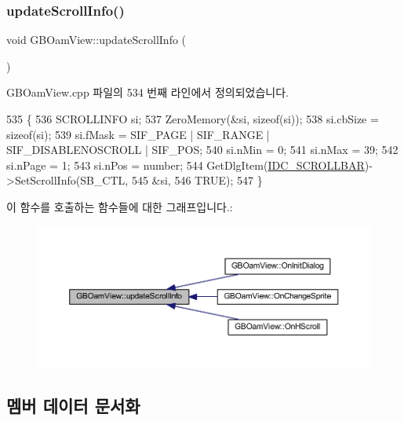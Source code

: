 \subsubsection{\texorpdfstring{update\+Scroll\+Info()}{updateScrollInfo()}}
{\footnotesize\ttfamily void G\+B\+Oam\+View\+::update\+Scroll\+Info (\begin{DoxyParamCaption}{ }\end{DoxyParamCaption})}



G\+B\+Oam\+View.\+cpp 파일의 534 번째 라인에서 정의되었습니다.


\begin{DoxyCode}
535 \{
536   SCROLLINFO si;
537   ZeroMemory(&si, \textcolor{keyword}{sizeof}(si));
538   si.cbSize = \textcolor{keyword}{sizeof}(si);
539   si.fMask = SIF\_PAGE | SIF\_RANGE | SIF\_DISABLENOSCROLL | SIF\_POS;
540   si.nMin = 0;
541   si.nMax = 39;
542   si.nPage = 1;
543   si.nPos = number;
544   GetDlgItem(\mbox{\hyperlink{resource_8h_ae17ccfaa60dc621c2a9b5650c81afe77}{IDC\_SCROLLBAR}})->SetScrollInfo(SB\_CTL,
545                                            &si,
546                                            TRUE);    
547 \}
\end{DoxyCode}
이 함수를 호출하는 함수들에 대한 그래프입니다.\+:
\nopagebreak
\begin{figure}[H]
\begin{center}
\leavevmode
\includegraphics[width=350pt]{class_g_b_oam_view_a20ce1c6ed837362872920c23e281e523_icgraph}
\end{center}
\end{figure}


\subsection{멤버 데이터 문서화}
\mbox{\label{class_g_b_oam_view_a696d053b141cce3bf87fc4b85732159b}} 
